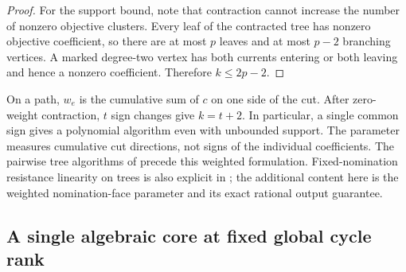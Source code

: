 \begin{proof}
For the support bound, note that contraction cannot increase the
number of nonzero objective clusters. Every leaf of the contracted tree
has nonzero objective coefficient, so there are at most $p$ leaves and at
most $p-2$ branching vertices. A marked degree-two vertex has both
currents entering or both leaving and hence a nonzero coefficient.
Therefore $k\le2p-2$.
\end{proof}

On a path, $w_e$ is the cumulative sum of $c$ on one side of the cut.
After zero-weight contraction, $t$ sign changes give $k=t+2$.
In particular, a single common sign gives a polynomial algorithm even with
unbounded support. The parameter measures cumulative cut directions,
not signs of the individual coefficients. The pairwise tree algorithms
of \citet[Section 5 of the author manuscript]{labbe2020-bookings-in-the-european-gas} precede this
weighted formulation. Fixed-nomination resistance linearity on trees is
also explicit in \citet[Section 4.2]{amann2018-deciding-robust-feasibility-and-infeasibility};
the additional content here is the weighted nomination-face parameter
and its exact rational output guarantee.

\subsection{A single algebraic core at fixed global cycle rank}

